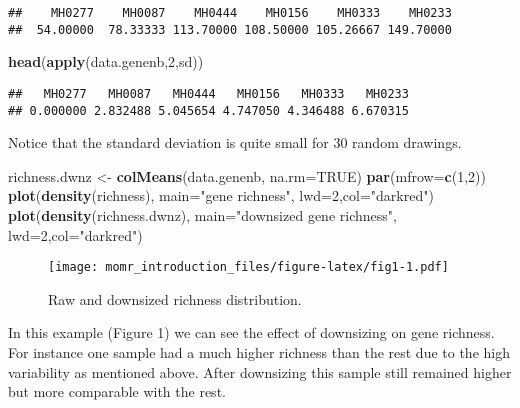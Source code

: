\documentclass[]{article}
\newenvironment{Shaded}{\begin{snugshade}}{\end{snugshade}}
\newcommand{\KeywordTok}[1]{\textcolor[rgb]{0.13,0.29,0.53}{\textbf{{#1}}}}
\newcommand{\DataTypeTok}[1]{\textcolor[rgb]{0.13,0.29,0.53}{{#1}}}
\newcommand{\DecValTok}[1]{\textcolor[rgb]{0.00,0.00,0.81}{{#1}}}
\newcommand{\StringTok}[1]{\textcolor[rgb]{0.31,0.60,0.02}{{#1}}}
\newcommand{\OtherTok}[1]{\textcolor[rgb]{0.56,0.35,0.01}{{#1}}}
\newcommand{\NormalTok}[1]{{#1}}
\begin{document}
\begin{verbatim}
##    MH0277    MH0087    MH0444    MH0156    MH0333    MH0233 
##  54.00000  78.33333 113.70000 108.50000 105.26667 149.70000
\end{verbatim}

\begin{Shaded}
\begin{Highlighting}[]
\KeywordTok{head}\NormalTok{(}\KeywordTok{apply}\NormalTok{(data.genenb,}\DecValTok{2}\NormalTok{,sd))}
\end{Highlighting}
\end{Shaded}

\begin{verbatim}
##   MH0277   MH0087   MH0444   MH0156   MH0333   MH0233 
## 0.000000 2.832488 5.045654 4.747050 4.346488 6.670315
\end{verbatim}

Notice that the standard deviation is quite small for 30 random
drawings.

\begin{Shaded}
\begin{Highlighting}[]
\NormalTok{richness.dwnz <-}\StringTok{ }\KeywordTok{colMeans}\NormalTok{(data.genenb, }\DataTypeTok{na.rm=}\OtherTok{TRUE}\NormalTok{)}
\KeywordTok{par}\NormalTok{(}\DataTypeTok{mfrow=}\KeywordTok{c}\NormalTok{(}\DecValTok{1}\NormalTok{,}\DecValTok{2}\NormalTok{))}
\KeywordTok{plot}\NormalTok{(}\KeywordTok{density}\NormalTok{(richness), }\DataTypeTok{main=}\StringTok{"gene richness"}\NormalTok{, }\DataTypeTok{lwd=}\DecValTok{2}\NormalTok{,}\DataTypeTok{col=}\StringTok{"darkred"}\NormalTok{)}
\KeywordTok{plot}\NormalTok{(}\KeywordTok{density}\NormalTok{(richness.dwnz), }\DataTypeTok{main=}\StringTok{"downsized gene richness"}\NormalTok{, }\DataTypeTok{lwd=}\DecValTok{2}\NormalTok{,}\DataTypeTok{col=}\StringTok{"darkred"}\NormalTok{)}
\end{Highlighting}
\end{Shaded}

\begin{figure}[htbp]
\centering
\texttt{[image: momr\_introduction\_files/figure-latex/fig1-1.pdf]}
\caption{Raw and downsized richness distribution.}
\end{figure}

In this example (Figure 1) we can see the effect of downsizing on gene
richness. For instance one sample had a much higher richness than the
rest due to the high variability as mentioned above. After downsizing
this sample still remained higher but more comparable with the rest.
\end{document}

